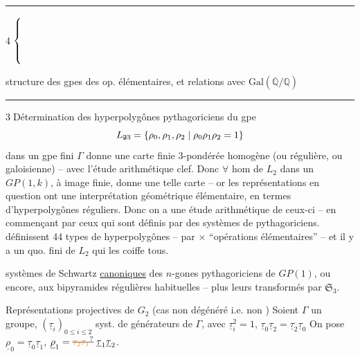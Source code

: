 \noindent\rule{.30\linewidth}{.4pt}

\noindent\textcircled{4}\(\left\{\vphantom{\rule{0pt}{10mm}}\right.\)\begin{minipage}{.87\linewidth}
structure des gpes des op. élémentaires,
et relations avec $\mathrm{Gal}(\overline{\mathbb Q}/\mathbb Q)$
\end{minipage}

\noindent\rule{.41\linewidth}{.4pt}

\textcircled{3}\quad Détermination des hyperpolygônes pythagoriciens   \unsure{$\{\ldots\}$)}
   du gpe 
\[L_{\deleted{2}3}=\{\rho_0,\rho_1,\rho_2\mid\rho_0\rho_1\rho_2=1\}\]
dans un gpe fini $\Gamma$ donne une carte finie
 $3$-pondérée homogène (ou régulière,
ou galoisienne) -- avec l'étude arithmétique
 clef. Donc $\forall$ hom de $L_2$ dans un
$GP(1,k)$,  à image finie, donne une telle
carte -- or les représentations en question
ont une interprétation géométrique
élémentaire, en termes d'hyperpolygônes
réguliers. Donc on a une étude
arithmétique  de ceux-ci -- en
commençant par ceux qui sont
définis par des systèmes de 
 pythagoriciens.  définissent
44 types de hyperpolygônes --  par
 $\times$ ``opérations élémentaires'' --
et il y a un  quo.  fini de
$L_2$ qui les coiffe tous.

systèmes de Schwartz \uline{canoniques}
des $n$-gones pythagoriciens de $GP(1)$,
ou encore, aux bipyramides régulières habituelles
-- plus leurs transformés par $\mathfrak S_3$.

Représentations projectives de $G_2$
(cas non dégénéré i.e.
non )
Soient $\Gamma$ un groupe, $(\underline{\tau}_i)_{0\leq i\leq2}$  syst. de générateurs de $\Gamma$, avec $\underline{\tau}_i^2=1$, $\underline{\tau}_0\underline{\tau}_2=\underline{\tau}_2\underline{\tau}_0$
On pose $\underline{\rho}_0=\underline{\tau}_0\underline{\tau}_1$, $\underline{\rho}_1=\deleted{\unsure{\tau_2\tau_1}}\;\underline{\tau}_1\underline{\tau}_2$.

